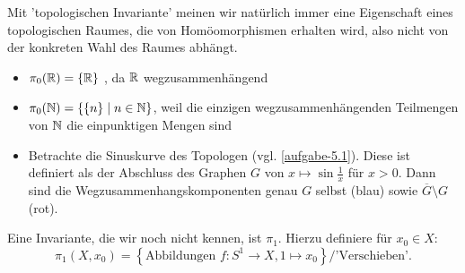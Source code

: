 \begin{remark*}
    Mit 'topologischen Invariante' meinen wir natürlich immer eine Eigenschaft eines topologischen Raumes, die von Homöomorphismen erhalten wird, also nicht von der konkreten Wahl des Raumes abhängt.
\end{remark*}

\begin{example}
    \begin{itemize}
        \item $\pi_0(\mathbb{R}) = \left \{\mathbb{R}\right\}$ , da $\mathbb{R}$ wegzusammenhängend
        \item $\pi_0(\mathbb{N}) = \left \{\left \{n\right\} \mid n\in \mathbb{N}\right\}$, weil die einzigen wegzusammenhängenden Teilmengen von $\mathbb{N}$ die einpunktigen Mengen sind
        \item Betrachte die Sinuskurve des Topologen (vgl. \autoref{aufgabe-5.1}). Diese ist definiert als der Abschluss des Graphen $G$ von $x \mapsto \sin  \frac{1}{x}$ für $x>0$. Dann sind die Wegzusammenhangskomponenten genau $G$ selbst (blau) sowie  $\overline{G} \setminus G$ (rot). \\
            \begin{minipage}{\textwidth}
            \centering
            \end{minipage}
    \end{itemize}
\end{example}

\begin{example}
    Eine Invariante, die wir noch nicht kennen, ist $\pi_1$. Hierzu definiere für $x_0\in X$:
    \[
        \pi_1(X,x_0) = \left \{\text{Abbildungen } f\colon S^1 \to  X, 1 \mapsto x_0\right\} / \text{'Verschieben'}
    .\] 
\end{example}

